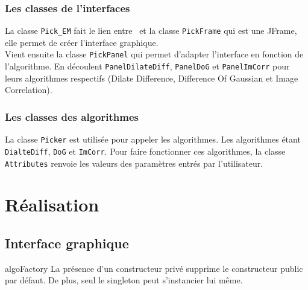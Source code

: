 \documentclass[12pt,a4paper]{report}
\begin{document}
\subsection{Les classes de l'interfaces}

La classe \texttt{Pick\_EM} fait le lien entre \imj ~et la classe \texttt{PickFrame} qui est une JFrame, elle permet de créer l'interface graphique.\\
Vient ensuite la classe \texttt{PickPanel} qui permet d'adapter l'interface en fonction de l'algorithme. En découlent \texttt{PanelDilateDiff}, \texttt{PanelDoG} et \texttt{PanelImCorr} pour leurs algorithmes respectifs (Dilate Difference, Difference Of Gaussian et Image Correlation).

\subsection{Les classes des algorithmes}

La classe \texttt{Picker} est utilisée pour appeler les algorithmes. Les algorithmes étant \texttt{DialteDiff}, \texttt{DoG} et \texttt{ImCorr}.
Pour faire fonctionner ces algorithmes, la classe \texttt{Attributes} renvoie les valeurs des paramètres entrés par l'utilisateur.

\chapter{Réalisation}

\section{Interface graphique}




















algoFactory
La présence d'un constructeur privé supprime le constructeur public par défaut.
De plus, seul le singleton peut s'instancier lui même.
\end{document}
